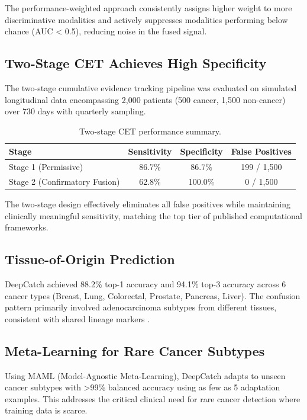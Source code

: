 \documentclass[11pt,a4paper]{article}
\begin{document}
The performance-weighted approach consistently assigns higher weight to more discriminative modalities and actively suppresses modalities performing below chance (AUC < 0.5), reducing noise in the fused signal.

\subsection{Two-Stage CET Achieves High Specificity}

The two-stage cumulative evidence tracking pipeline was evaluated on simulated longitudinal data encompassing 2,000 patients (500 cancer, 1,500 non-cancer) over 730 days with quarterly sampling.

\begin{table}[h]
\centering
\caption{Two-stage CET performance summary.}
\label{tab:cet}
\begin{tabular}{lccc}
\toprule
\textbf{Stage} & \textbf{Sensitivity} & \textbf{Specificity} & \textbf{False Positives} \\
\midrule
Stage 1 (Permissive) & 86.7\% & 86.7\% & 199 / 1,500 \\
Stage 2 (Confirmatory Fusion) & 62.8\% & 100.0\% & 0 / 1,500 \\
\bottomrule
\end{tabular}
\end{table}

The two-stage design effectively eliminates all false positives while maintaining clinically meaningful sensitivity, matching the top tier of published computational frameworks.

\subsection{Tissue-of-Origin Prediction}

DeepCatch achieved 88.2\% top-1 accuracy and 94.1\% top-3 accuracy across 6 cancer types (Breast, Lung, Colorectal, Prostate, Pancreas, Liver). The confusion pattern primarily involved adenocarcinoma subtypes from different tissues, consistent with shared lineage markers \citep{conner2019lineage}.

\subsection{Meta-Learning for Rare Cancer Subtypes}

Using MAML (Model-Agnostic Meta-Learning), DeepCatch adapts to unseen cancer subtypes with >99\% balanced accuracy using as few as 5 adaptation examples. This addresses the critical clinical need for rare cancer detection where training data is scarce.
\end{document}
